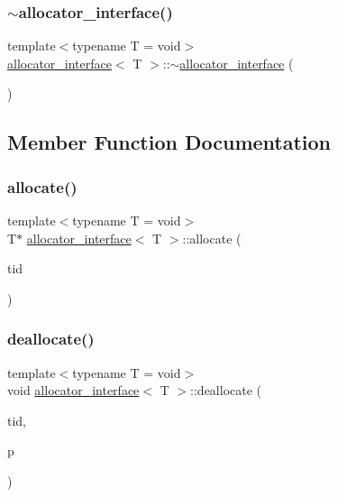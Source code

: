 \subsubsection{\texorpdfstring{$\sim$allocator\+\_\+interface()}{~allocator\_interface()}}
{\footnotesize\ttfamily template$<$typename T  = void$>$ \\
\hyperlink{classallocator__interface}{allocator\+\_\+interface}$<$ T $>$\+::$\sim$\hyperlink{classallocator__interface}{allocator\+\_\+interface} (\begin{DoxyParamCaption}{ }\end{DoxyParamCaption})\hspace{0.3cm}{\ttfamily [inline]}}



\subsection{Member Function Documentation}
\mbox{\label{classallocator__interface_a3694fb05c3cf5edaea1675c90de6a435}} 
\subsubsection{\texorpdfstring{allocate()}{allocate()}}
{\footnotesize\ttfamily template$<$typename T  = void$>$ \\
T$\ast$ \hyperlink{classallocator__interface}{allocator\+\_\+interface}$<$ T $>$\+::allocate (\begin{DoxyParamCaption}\item[{const int}]{tid }\end{DoxyParamCaption})}

\mbox{\label{classallocator__interface_a608c7d3ca4735cc0a0c7d200a7e641f5}} 
\subsubsection{\texorpdfstring{deallocate()}{deallocate()}}
{\footnotesize\ttfamily template$<$typename T  = void$>$ \\
void \hyperlink{classallocator__interface}{allocator\+\_\+interface}$<$ T $>$\+::deallocate (\begin{DoxyParamCaption}\item[{const int}]{tid,  }\item[{T $\ast$const}]{p }\end{DoxyParamCaption})}

